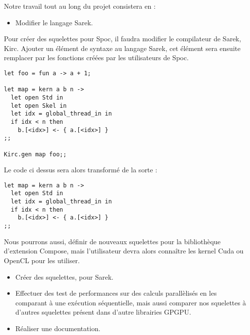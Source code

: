 \documentclass{report}
\begin{document}
Notre travail tout au long du projet consistera en :
\begin{itemize}
\item Modifier le langage Sarek.
\end{itemize}

Pour créer des squelettes pour Spoc, il faudra modifier le compilateur de Sarek, Kirc. Ajouter un élément de syntaxe au langage Sarek, cet élément sera ensuite remplacer par les fonctions créées par les utilisateurs de Spoc. 

\begin{lstlisting}
let foo = fun a -> a + 1;

let map = kern a b n ->
  let open Std in
  let open Skel in
  let idx = global_thread_in in
  if idx < n then
    b.[<idx>] <- { a.[<idx>] }
;;

Kirc.gen map foo;; 
\end{lstlisting}

Le code ci dessus sera alors transformé de la sorte :

\begin{lstlisting}
let map = kern a b n ->
  let open Std in
  let idx = global_thread_in in
  if idx < n then
    b.[<idx>] <- { a.[<idx>] }
;;
\end{lstlisting}

Nous pourrons aussi, définir de nouveaux squelettes pour la bibliothèque d’extension Compose, mais l’utilisateur devra alors connaître les kernel Cuda ou OpenCL pour les utiliser. 

\begin{itemize}
\item Créer des squelettes, pour Sarek.
\item Effectuer des test de performances sur des calculs parallèlisés en les comparant à une exécution séquentielle, mais aussi comparer nos squelettes à d’autres squelettes présent dans d’autre librairies GPGPU.
\item Réaliser une documentation.
\end{itemize}

%
%
\end{document}
